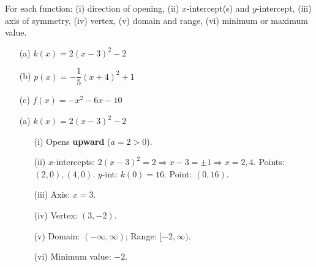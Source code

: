 \documentclass{ximera}
\begin{document}
\begin{problem}
For each function: (i) direction of opening, (ii) $x$-intercept(s) and $y$-intercept, (iii) axis of symmetry, (iv) vertex, (v) domain and range, (vi) minimum or maximum value.
\begin{enumerate}
  \item[(a)] $k(x) = 2(x-3)^2 - 2$
  \medskip
  \item[(b)] $p(x) = -\dfrac{1}{5}(x+4)^2 + 1$
  \medskip
  \item[(c)] $f(x) = -x^2 - 6x - 10$
\end{enumerate}

\begin{solution}
\begin{enumerate}
  \item[(a)] $k(x) = 2(x-3)^2-2$
  \begin{enumerate}
    \item[(i)] Opens \textbf{upward} ($a=2>0$).
    \item[(ii)] $x$-intercepts: $2(x-3)^2=2 \Rightarrow x-3=\pm1 \Rightarrow x=2,4$. Points: $(2,0),(4,0)$. $y$-int: $k(0)=16$. Point: $(0,16)$.
    \item[(iii)] Axis: $x=3$.
    \item[(iv)] Vertex: $(3,-2)$.
    \item[(v)] Domain: $(-\infty,\infty)$; Range: $[-2,\infty)$.
    \item[(vi)] Minimum value: $-2$.
  \end{enumerate}
\begin{center}
\end{center}


\end{enumerate}
\end{solution}
\end{problem}
\end{document}
